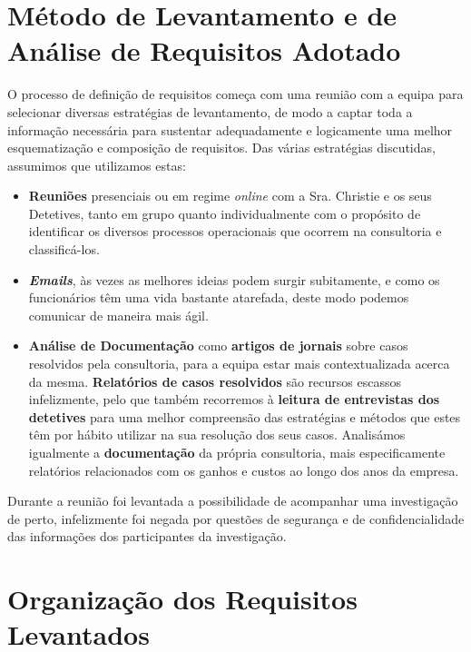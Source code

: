 \documentclass[a4paper,12pt]{scrreprt}
\begin{document}
    \section{Método de Levantamento e de Análise de Requisitos Adotado}
        \label{sec:2.1}
            O processo de definição de requisitos começa com uma reunião com a equipa para selecionar diversas estratégias de levantamento, de modo a captar toda a informação necessária para sustentar adequadamente e logicamente uma melhor esquematização e composição de requisitos. Das várias estratégias discutidas, assumimos que utilizamos estas:
            \begin{itemize}
            \item \textbf{Reuniões} presenciais ou em regime \textit{online} com a Sra$.$ Christie e os seus Detetives, tanto em grupo quanto individualmente com o propósito de identificar os diversos processos operacionais que ocorrem na consultoria e classificá-los.
            \item \textit{\textbf{Emails}}, às vezes as melhores ideias podem surgir subitamente, e como os funcionários têm uma vida bastante atarefada, deste modo podemos comunicar de maneira mais ágil.
            \item \textbf{Análise de Documentação} como \textbf{artigos de jornais} sobre casos resolvidos pela consultoria, para a equipa estar mais contextualizada acerca da mesma.
            \textbf{Relatórios de casos resolvidos} são recursos escassos infelizmente, pelo que também recorremos à \textbf{leitura de entrevistas dos detetives} para uma melhor compreensão das estratégias e métodos que estes têm por hábito utilizar na sua resolução dos seus casos. Analisámos igualmente a \textbf{documentação} da própria consultoria, mais especificamente relatórios relacionados com os ganhos e custos ao longo dos anos da empresa.
            \end{itemize}
            
            Durante a reunião foi levantada a possibilidade de acompanhar uma investigação de perto, infelizmente foi negada por questões de segurança e de confidencialidade das informações dos participantes da investigação. 
            
    \section{Organização dos Requisitos Levantados}
        \label{sec:2.2}
\end{document}
